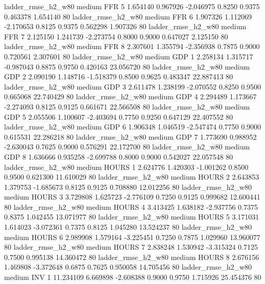    ladder_rmse_h2_w80     medium      FFR                 5  1.654140 0.967926 -2.046975 0.8250 0.9375  0.463378    1.654140 80
    ladder_rmse_h2_w80     medium      FFR                 6  1.907326 1.112069 -2.170653 0.8125 0.9375  0.562298    1.907326 80
    ladder_rmse_h2_w80     medium      FFR                 7  2.125150 1.241739 -2.273754 0.8000 0.9000  0.647027    2.125150 80
    ladder_rmse_h2_w80     medium      FFR                 8  2.307601 1.355794 -2.356938 0.7875 0.9000  0.720561    2.307601 80
    ladder_rmse_h2_w80     medium      GDP                 1  2.258134 1.315717 -0.987043 0.8875 0.9750  0.420163   23.056720 80
    ladder_rmse_h2_w80     medium      GDP                 2  2.090190 1.148716 -1.518379 0.8500 0.9625  0.483347   22.887413 80
    ladder_rmse_h2_w80     medium      GDP                 3  2.611478 1.238199 -2.070552 0.8250 0.9500  0.665068   22.740429 80
    ladder_rmse_h2_w80     medium      GDP                 4  2.294489 1.173667 -2.274093 0.8125 0.9125  0.661671   22.566508 80
    ladder_rmse_h2_w80     medium      GDP                 5  2.055506 1.100607 -2.403694 0.7750 0.9250  0.647129   22.407552 80
    ladder_rmse_h2_w80     medium      GDP                 6  1.906348 1.046519 -2.547474 0.7750 0.9000  0.615531   22.286218 80
    ladder_rmse_h2_w80     medium      GDP                 7  1.773690 0.988952 -2.630043 0.7625 0.9000  0.576291   22.172700 80
    ladder_rmse_h2_w80     medium      GDP                 8  1.636666 0.935258 -2.699788 0.8000 0.9000  0.542027   22.057548 80
    ladder_rmse_h2_w80     medium    HOURS                 1  2.624776 1.420303 -1.001262 0.8500 0.9500  0.621300   11.610029 80
    ladder_rmse_h2_w80     medium    HOURS                 2  2.643853 1.379753 -1.685673 0.8125 0.9125  0.708880   12.012256 80
    ladder_rmse_h2_w80     medium    HOURS                 3  3.729808 1.625723 -2.776109 0.7250 0.9125  0.999682   12.600441 80
    ladder_rmse_h2_w80     medium    HOURS                 4  3.413425 1.638182 -2.937756 0.7375 0.8375  1.042455   13.071977 80
    ladder_rmse_h2_w80     medium    HOURS                 5  3.171031 1.614023 -3.072361 0.7375 0.8125  1.045280   13.524237 80
    ladder_rmse_h2_w80     medium    HOURS                 6  2.989908 1.579164 -3.225451 0.7250 0.7875  1.029960   13.960077 80
    ladder_rmse_h2_w80     medium    HOURS                 7  2.838248 1.530942 -3.315324 0.7125 0.7500  0.995138   14.360472 80
    ladder_rmse_h2_w80     medium    HOURS                 8  2.676156 1.469808 -3.372648 0.6875 0.7625  0.950058   14.705456 80
    ladder_rmse_h2_w80     medium      INV                 1 11.234109 6.669898 -2.608388 0.9000 0.9750  1.715926   25.454376 80
